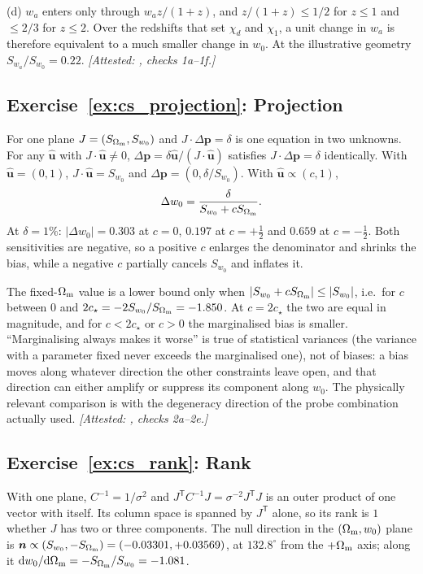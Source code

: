 (d) $w_a$ enters only through $w_az/(1+z)$, and
$z/(1+z)\le1/2$ for $z\le1$ and $\le2/3$ for $z\le2$. Over the
redshifts that set $\chi_d$ and $\chi_1$, a unit change in $w_a$ is
therefore equivalent to a much smaller change in $w_0$. At the
illustrative geometry $S_{w_a}/S_{w_0}=0.22$.
\emph{[Attested: , checks 1a--1f.]}

\subsection*{Exercise~\ref{ex:cs_projection}: Projection}

For one plane $J=(S_{\Omega_{\mathrm{m}}},S_{w_0})$ and $J\cdot\Delta\bm{p}=\delta$
is one equation in two unknowns. For any $\hat{\bm{u}}$ with
$J\cdot\hat{\bm{u}}\neq0$, $\Delta\bm{p}=\delta\hat{\bm{u}}/(J\cdot
\hat{\bm{u}})$ satisfies $J\cdot\Delta\bm{p}=\delta$ identically. With
$\hat{\bm{u}}=(0,1)$, $J\cdot\hat{\bm{u}}=S_{w_0}$ and
$\Delta\bm{p}=(0,\delta/S_{w_0})$. With $\hat{\bm{u}}\propto(c,1)$,
\[
  \Delta w_0=\frac{\delta}{S_{w_0}+cS_{\Omega_{\mathrm{m}}}} .
\]
At $\delta=1\%$: $|\Delta w_0|=0.303$ at $c=0$, $0.197$ at
$c=+\tfrac12$ and $0.659$ at $c=-\tfrac12$. Both sensitivities are
negative, so a positive $c$ enlarges the denominator and shrinks the
bias, while a negative $c$ partially cancels $S_{w_0}$ and inflates it.

The fixed-$\Omega_{\mathrm{m}}$ value is a lower bound only when
$|S_{w_0}+cS_{\Omega_{\mathrm{m}}}|\le|S_{w_0}|$, i.e.\ for $c$ between $0$ and
$2c_\star=-2S_{w_0}/S_{\Omega_{\mathrm{m}}}=-1.850$. At $c=2c_\star$ the two are
equal in magnitude, and for $c<2c_\star$ or $c>0$ the marginalised bias
is smaller. ``Marginalising always makes it worse'' is true of
statistical variances (the variance with a parameter fixed never exceeds
the marginalised one), not of biases: a bias moves along
whatever direction the other constraints leave open, and that direction
can either amplify or suppress its component along $w_0$. The
physically relevant comparison is with the degeneracy direction of the
probe combination actually used.
\emph{[Attested: , checks 2a--2e.]}

\subsection*{Exercise~\ref{ex:cs_rank}: Rank}

With one plane, $C^{-1}=1/\sigma^2$ and
$J^{\mathsf T}C^{-1}J=\sigma^{-2}J^{\mathsf T}J$ is an outer product
of one vector with itself. Its column space is spanned by $J^{\mathsf T}$
alone, so its rank is $1$ whether $J$ has two or three components. The
null direction in the $(\Omega_{\mathrm{m}},w_0)$ plane is
$\bm{n}\propto(S_{w_0},-S_{\Omega_{\mathrm{m}}})=(-0.03301,+0.03569)$, at
$132.8^\circ$ from the $+\Omega_{\mathrm{m}}$ axis; along it
$\dd w_0/\dd\Omega_{\mathrm{m}}=-S_{\Omega_{\mathrm{m}}}/S_{w_0}=-1.081$.

